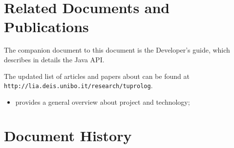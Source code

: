 \appendix

\chapter{Related Documents and Publications}
\label{publication}

The companion document to this document is the Developer's guide,
which describes in details the \tuprolog{} Java API.

The updated list of articles and papers about \tuprolog{} can be
found at \texttt{http://lia.deis.unibo.it/research/tuprolog}.

\begin{itemize}

\item \cite{tuprolog--padl2001} provides a general overview about
\tuprolog{} project and technology;


\end{itemize}



\chapter{Document History}
\label{history}

